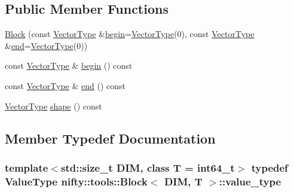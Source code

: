 \subsection*{Public Member Functions}
\begin{DoxyCompactItemize}
\item 
\hyperlink{classnifty_1_1tools_1_1Block_ab4fe7e24f2d3cd64b75a4e58b314170e}{Block} (const \hyperlink{classnifty_1_1tools_1_1Block_aa077b4ebbf3e4e9b679d1957ca10ba32}{Vector\+Type} \&\hyperlink{classnifty_1_1tools_1_1Block_ae11f59f462304ae59886bc7991fecef1}{begin}=\hyperlink{classnifty_1_1tools_1_1Block_aa077b4ebbf3e4e9b679d1957ca10ba32}{Vector\+Type}(0), const \hyperlink{classnifty_1_1tools_1_1Block_aa077b4ebbf3e4e9b679d1957ca10ba32}{Vector\+Type} \&\hyperlink{classnifty_1_1tools_1_1Block_a2b6bb43b03ea8c4d7f31f01d0143d60a}{end}=\hyperlink{classnifty_1_1tools_1_1Block_aa077b4ebbf3e4e9b679d1957ca10ba32}{Vector\+Type}(0))
\item 
const \hyperlink{classnifty_1_1tools_1_1Block_aa077b4ebbf3e4e9b679d1957ca10ba32}{Vector\+Type} \& \hyperlink{classnifty_1_1tools_1_1Block_ae11f59f462304ae59886bc7991fecef1}{begin} () const 
\item 
const \hyperlink{classnifty_1_1tools_1_1Block_aa077b4ebbf3e4e9b679d1957ca10ba32}{Vector\+Type} \& \hyperlink{classnifty_1_1tools_1_1Block_a2b6bb43b03ea8c4d7f31f01d0143d60a}{end} () const 
\item 
\hyperlink{classnifty_1_1tools_1_1Block_aa077b4ebbf3e4e9b679d1957ca10ba32}{Vector\+Type} \hyperlink{classnifty_1_1tools_1_1Block_a2a7c4eb08521c7624f27a096f0c915db}{shape} () const 
\end{DoxyCompactItemize}


\subsection{Member Typedef Documentation}
\hypertarget{classnifty_1_1tools_1_1Block_accbed9defe9a82425025d9182c41e0a6}{}
\subsubsection[{value\+\_\+type}]{\setlength{\rightskip}{0pt plus 5cm}template$<$std\+::size\+\_\+t D\+I\+M, class T  = int64\+\_\+t$>$ typedef {\bf Value\+Type} {\bf nifty\+::tools\+::\+Block}$<$ D\+I\+M, T $>$\+::{\bf value\+\_\+type}}\label{classnifty_1_1tools_1_1Block_accbed9defe9a82425025d9182c41e0a6}


